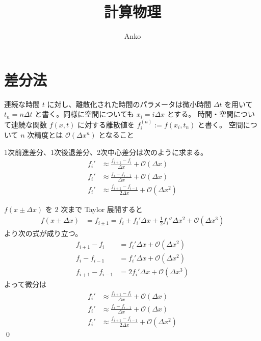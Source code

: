 \documentclass[uplatex,dvipdfmx,a4paper,11pt]{jlreq}
\title{計算物理}
\author{Anko}
\makeatletter
\theoremstyle{definition}
\renewenvironment{proof}[1][\proofname]{\par
  \normalfont
  \topsep6\p@\@plus6\p@ \trivlist
  \item[\hskip\labelsep{\bfseries #1}\@addpunct{\bfseries}]\ignorespaces\quad\par
}{%
  \qed\endtrivlist\@endpefalse
}
\renewcommand\proofname{証明}
\makeatother
\begin{document}
\maketitle
\tableofcontents
\clearpage

\section{差分法}
\begin{definition}
  連続な時間 $t$ に対し、離散化された時間のパラメータは微小時間 $\Delta t$ を用いて $t_n = n\Delta t$ と書く。同様に空間についても $x_i = i\Delta x$ とする。
  時間・空間について連続な関数 $f(x, t)$ に対する離散値を $f_i^{(n)} := f(x_i, t_n)$ と書く。
  空間について $n$ 次精度とは $\mathcal{O}(\Delta x^n)$ となること
\end{definition}



\begin{theorem}[1階微分の差分公式]
  1次前進差分、1次後退差分、2次中心差分は次のように求まる。
  \begin{align}
    f_i' & \approx \frac{f_{i+1} - f_i}{\Delta x} + \mathcal{O}(\Delta x)        \\
    f_i' & \approx \frac{f_i - f_{i-1}}{\Delta x} + \mathcal{O}(\Delta x)        \\
    f_i' & \approx \frac{f_{i+1} - f_{i-1}}{2\Delta x} + \mathcal{O}(\Delta x^2)
  \end{align}
\end{theorem}
\begin{proof}
  $f(x \pm \Delta x)$ を 2 次まで Taylor 展開すると
  \begin{align}
    f(x \pm \Delta x) & = f_{i \pm 1} = f_i \pm f_i'\Delta x + \frac{1}{2}f_i''\Delta x^2 + \mathcal{O}(\Delta x^3)
  \end{align}
  より次の式が成り立つ。
  \begin{align}
    f_{i + 1} - f_i       & = f_i'\Delta x + \mathcal{O}(\Delta x^2)  \\
    f_i - f_{i - 1}       & = f_i'\Delta x + \mathcal{O}(\Delta x^2)  \\
    f_{i + 1} - f_{i - 1} & = 2f_i'\Delta x + \mathcal{O}(\Delta x^3)
  \end{align}
  よって微分は
  \begin{align}
    f_i' & \approx \frac{f_{i+1} - f_i}{\Delta x} + \mathcal{O}(\Delta x)        \\
    f_i' & \approx \frac{f_i - f_{i-1}}{\Delta x} + \mathcal{O}(\Delta x)        \\
    f_i' & \approx \frac{f_{i+1} - f_{i-1}}{2\Delta x} + \mathcal{O}(\Delta x^2)
  \end{align}
\end{proof}
\end{document}
